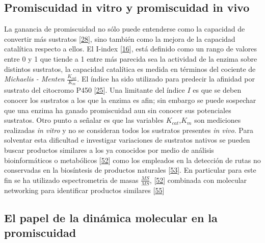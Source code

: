 \documentclass[12pt,twoside]{reedthesis}
\begin{document}
  \subsection{Promiscuidad in vitro y promiscuidad in
  vivo}\label{promiscuidad-in-vitro-y-promiscuidad-in-vivo}
  
  La ganancia de promiscuidad no sólo puede entenderse como la capacidad
  de convertir más sustratos
  {[}\protect\hyperlink{ref-carbonell_molecular_2010}{28}{]}, sino también
  como la mejora de la capacidad catalítica respecto a ellos. El I-index
  {[}\protect\hyperlink{ref-nath_quantitative_2008}{16}{]}, está definido
  como un rango de valores entre 0 y 1 que tiende a 1 entre más parecida
  sea la actividad de la enzima sobre distintos sustratos, la capacidad
  catalítica es medida en términos del cociente de \emph{Michaelis -
  Menten} \(\frac{K_{cat}}{K_m}\). El índice ha sido utilizado para
  predecir la afinidad por sustrato del citocromo P450
  {[}\protect\hyperlink{ref-nath_quantifying_2010}{25}{]}. Una limitante
  del índice \(I\) es que se deben conocer los sustratos a los que la
  enzima es afin; sin embargo se puede sospechar que una enzima ha ganado
  promiscuidad aun sin conocer sus potenciales sustratos. Otro punto a
  señalar es que las variables \(K_{cat}\),\(K_m\) son mediciones
  realizadas \emph{in vitro} y no se consideran todos los sustratos
  presentes \emph{in vivo}. Para solventar esta dificultad e investigar
  variaciones de sustratos nativos se pueden buscar productos similares a
  los ya conocidos por medio de análisis bioinformáticos o metabólicos
  {[}\protect\hyperlink{ref-nesvizhskii_analysis_2007}{52}{]} como los
  empleados en la detección de rutas no conservadas en la biosíntesis de
  productos naturales
  {[}\protect\hyperlink{ref-medema_computational_2015}{53}{]}. En
  particular para este fin se ha utilizado espectrometria de masas
  \(\frac{MS}{MS}\),
  {[}\protect\hyperlink{ref-nesvizhskii_analysis_2007}{52}{]} combinada
  con molecular networking para identificar productos similares
  {[}\protect\hyperlink{ref-yang_molecular_2013}{55}{]}
  
  \subsection{El papel de la dinámica molecular en la
  promiscuidad}\label{el-papel-de-la-dinamica-molecular-en-la-promiscuidad}
  
\end{document}
